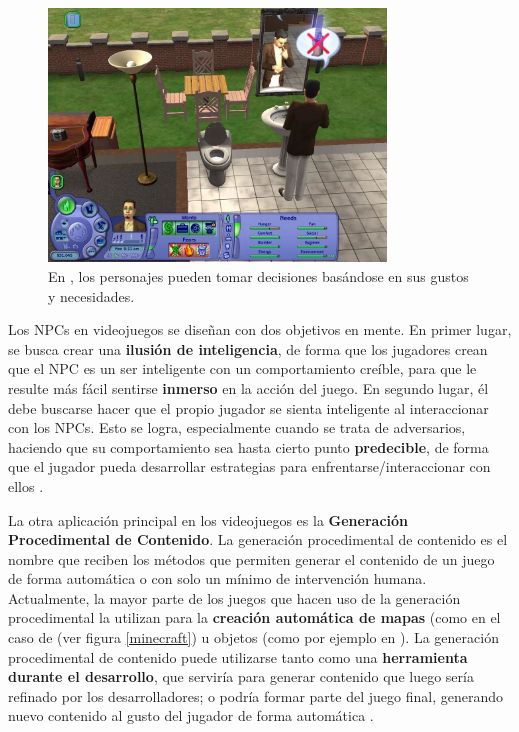 \begin{figure}[h]
	\includegraphics[width=0.8\textwidth]{images/estadodelarte/ai/sims-captura}
	\centering
	\caption{En , los personajes pueden tomar decisiones basándose en sus gustos y necesidades.}
	\label{sims-captura}
\end{figure}

Los NPCs en videojuegos se diseñan con dos objetivos en mente. En primer lugar, se busca crear una \textbf{ilusión de inteligencia}, de forma que los jugadores crean que el NPC es un ser inteligente con un comportamiento creíble, para que le resulte más fácil sentirse \textbf{inmerso} en la acción del juego. En segundo lugar, él debe buscarse hacer que el propio jugador se sienta inteligente al interaccionar con los NPCs. Esto se logra, especialmente cuando se trata de adversarios, haciendo que su comportamiento sea hasta cierto punto \textbf{predecible}, de forma que el jugador pueda desarrollar estrategias para enfrentarse/interaccionar con ellos \cite{ia_moderno}. 

La otra aplicación principal en los videojuegos es la \textbf{Generación Procedimental de Contenido}. La generación procedimental de contenido es el nombre que reciben los métodos que permiten generar el contenido de un juego de forma automática o con solo un mínimo de intervención humana. Actualmente, la mayor parte de los juegos que hacen uso de la generación procedimental la utilizan para la \textbf{creación automática de mapas} (como en el caso de  (ver figura \ref{minecraft}) u objetos (como por ejemplo en ). La generación procedimental de contenido puede utilizarse tanto como una \textbf{herramienta durante el desarrollo}, que serviría para generar contenido que luego sería refinado por los desarrolladores; o podría formar parte del juego final, generando nuevo contenido al gusto del jugador de forma automática \cite{ai_and_games}.

